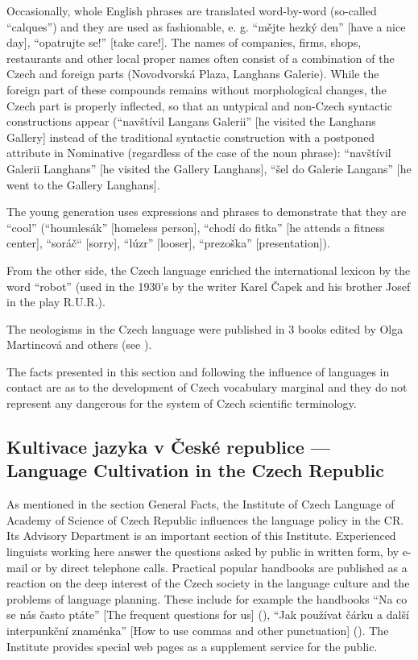 \documentclass[]{../../metanetpaper}
\begin{document}
\begin{multicols}{2}
Occasionally, whole English phrases are translated word-by-word (so-called “calques”) and they are used as fashionable, e. g. “mějte hezký den” {[}have a nice day{]}, “opatrujte se!” {[}take care!{]}. The names of companies, firms, shops, restaurants and other local proper names often consist of a combination of the Czech and foreign parts (Novodvorská Plaza, Langhans Galerie). While the foreign part of these compounds remains without morphological changes, the Czech part is properly inflected, so that an untypical and non-Czech syntactic constructions appear (“navštívil Langans Galerii” {[}he visited the Langhans Gallery{]} instead of the traditional syntactic construction with a postponed attribute in Nominative (regardless of the case of the noun phrase): “navštívil Galerii Langhans” {[}he visited the Gallery Langhans{]}, “šel do Galerie Langans” {[}he went to the Gallery Langhans{]}.

The young generation uses expressions and phrases to demonstrate that they are “cool” (“houmlesák” {[}homeless person{]}, “chodí do fitka” {[}he attends a fitness center{]}, “soráč“ {[}sorry{]}, “lúzr” {[}looser{]}, “prezoška” {[}presentation{]}).

From the other side, the Czech language enriched the international lexicon by the word “robot” (used in the 1930’s by the writer Karel Čapek and his brother Josef in the play R.U.R.).

The neologisms in the Czech language were published in 3 books edited by Olga Martincová and others (see \cite{Martincova_en}).

The facts presented in this section and following the influence of languages in contact are as to the development of Czech vocabulary marginal and they do not represent any dangerous for the system of Czech scientific terminology.

\subsection{Kultivace jazyka v České republice --- Language Cultivation in the Czech Republic}

As mentioned in the section General Facts, the Institute of Czech Language of Academy of Science of Czech Republic influences the language policy in the CR. Its Advisory Department is an important section of this Institute. Experienced linguists working here answer the questions asked by public in written form, by e-mail or by direct telephone calls. Practical popular handbooks are published as a reaction on the deep interest of the Czech society in the language culture and the problems of language planning. These include for example the handbooks “Na co se nás často ptáte” {[}The frequent questions for us{]} (\cite{Cerna}), “Jak používat čárku a další interpunkční znaménka” {[}How to use commas and other punctuation{]} (\cite{Janovec}). The Institute provides special web pages as a supplement service for the public.\cite{Note6}


\end{multicols}
\end{document}
